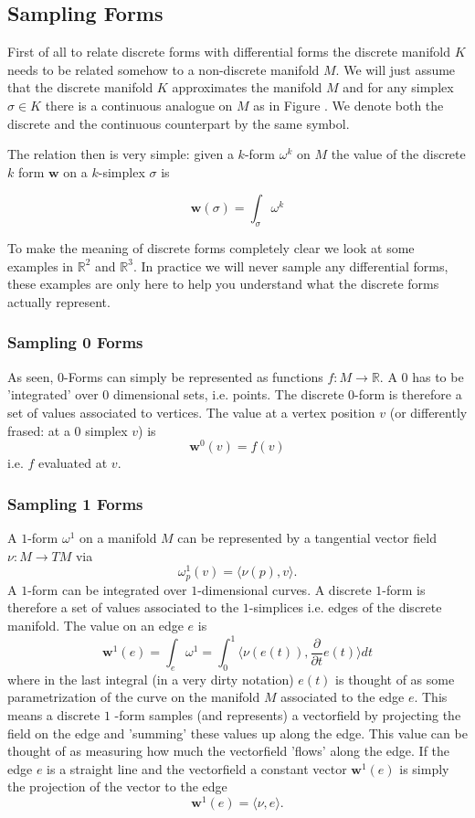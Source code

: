 \subsection{Sampling Forms}

First of all to relate discrete forms with differential forms the discrete manifold $K$ needs to be related somehow to a non-discrete manifold $M$. We will just assume that the discrete manifold $K$ approximates the manifold $M$ and for any simplex $\sigma \in K$ there is a continuous analogue on $M$ as in Figure . We denote both the discrete and the continuous counterpart by the same symbol.

The relation then is very simple: given a $k$-form $\omega^k$ on $M$ the value of the discrete $k$ form $\textbf{w}$ on a $k$-simplex $\sigma$ is

 \[\textbf{w}(\sigma) = \int_\sigma \omega^k\]

To make the meaning of discrete forms completely clear we look at some examples in $\mathbb R^2$ and $\mathbb R^3$. In practice we will never sample any differential forms, these examples are only here to help you understand what the discrete forms actually represent.

\subsubsection{Sampling 0 Forms}

As seen, $0$-Forms can simply be represented as functions $f: M\to \mathbb R$. A $0$ has to be 'integrated' over 0 dimensional sets, i.e. points. The discrete 0-form is therefore a set of values associated to vertices. The value at a vertex position $v$ (or differently frased: at a 0 simplex $v$) is
\[\textbf{w}^0(v) = f(v)\]
i.e. $f$ evaluated at $v$.

\subsubsection{Sampling 1 Forms}
A $1$-form $\omega^1$ on a manifold $M$ can be represented by a tangential vector field $\nu:M\to TM$ via 
\[\omega^1_p(v) = \langle\nu(p),v\rangle.\] 
A $1$-form can be integrated over $1$-dimensional curves. A discrete $1$-form is therefore a set of values associated to the $1$-simplices i.e. edges of the discrete manifold. The value on an edge $e$ is
\[\textbf{w}^1(e) = \int_{e} \omega^1 = \int_{0}^1 \langle\nu(e(t)),\frac{\partial}{\partial t}e(t)\rangle dt\]
where in the last integral (in a very dirty notation) $e(t)$ is thought of as some parametrization of the curve on the manifold $M$ associated to the edge $e$. This means a discrete $1$ -form samples (and represents) a vectorfield by projecting the field on the edge and 'summing' these values up along the edge. This value can be thought of as measuring how much the vectorfield 'flows' along the edge. If the edge $e$ is a straight line and the vectorfield a constant vector  $\textbf{w}^1(e)$ is simply the projection of the vector to the edge
\[\textbf{w}^1(e) = \langle \nu, e \rangle.\]

